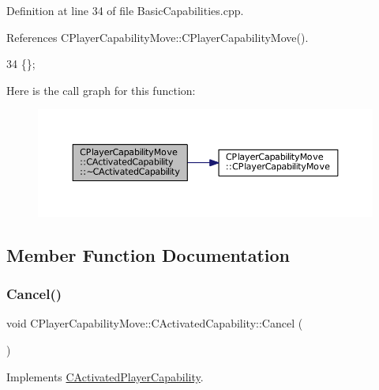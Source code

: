 Definition at line 34 of file Basic\+Capabilities.\+cpp.



References C\+Player\+Capability\+Move\+::\+C\+Player\+Capability\+Move().


\begin{DoxyCode}
34 \{\};
\end{DoxyCode}
Here is the call graph for this function\+:\nopagebreak
\begin{figure}[H]
\begin{center}
\leavevmode
\includegraphics[width=350pt]{classCPlayerCapabilityMove_1_1CActivatedCapability_a32285a6970ff939ebafc8ab9dd84317b_cgraph}
\end{center}
\end{figure}


\subsection{Member Function Documentation}
\hypertarget{classCPlayerCapabilityMove_1_1CActivatedCapability_a6fe1e26646bd14e94ebf7abd0a41cdd3}{}\label{classCPlayerCapabilityMove_1_1CActivatedCapability_a6fe1e26646bd14e94ebf7abd0a41cdd3} 
\subsubsection{\texorpdfstring{Cancel()}{Cancel()}}
{\footnotesize\ttfamily void C\+Player\+Capability\+Move\+::\+C\+Activated\+Capability\+::\+Cancel (\begin{DoxyParamCaption}{ }\end{DoxyParamCaption})\hspace{0.3cm}{\ttfamily [virtual]}}



Implements \hyperlink{classCActivatedPlayerCapability_a5cde83be468e262ad054d81e28684a81}{C\+Activated\+Player\+Capability}.



